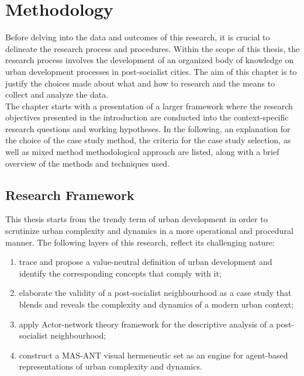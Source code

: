 \documentclass[11pt]{report}
\begin{document}

\chapter{Methodology}

Before delving into the data  and outcomes of this research, it is crucial to delineate the research process and procedures. Within the scope of this thesis, the research process involves the development of an organized body of knowledge on urban development processes in post-socialist cities. The aim of this chapter is to justify the choices made about what and how to research and the means to collect and analyze the data.
\\
The chapter starts with a presentation of a larger framework where the research objectives presented in the introduction are conducted into the context-specific research questions and working hypotheses. In the following, an explanation for the choice of the case study method, the criteria for the case study selection, as well as mixed method methodological approach are listed, along with a brief overview of the methods and techniques used.  

\section{Research Framework}

This thesis starts from the trendy term of urban development in order to scrutinize urban complexity and dynamics in a more operational and procedural manner. The following layers of this research, reflect its challenging nature:

\begin{enumerate}
\item trace and propose a value-neutral definition of urban development and identify the corresponding concepts that comply with it;
\item elaborate the validity of a post-socialist neighbourhood as a case study that blends and reveals the complexity and dynamics of a modern urban context;
\item apply Actor-network theory framework for the descriptive analysis of a post-socialist neighbourhood;
\item construct a MAS-ANT visual hermeneutic set as an engine for agent-based representations of urban complexity and dynamics.    
\end{enumerate}
\end{document}
